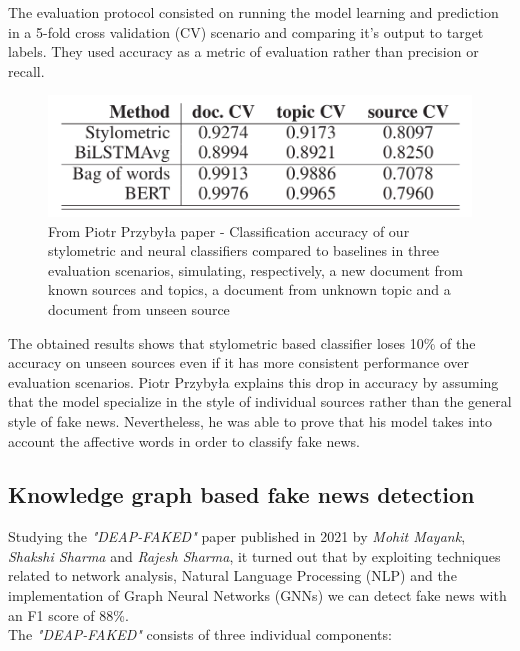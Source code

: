 \documentclass[10pt, english]{report}
\begin{document}
The evaluation protocol consisted on running the model learning and prediction in a 5-fold cross validation (CV) scenario and comparing it's output to target labels. They used accuracy as a metric of evaluation rather than precision or recall.

\begin{figure}[H]
	\centering
	\includegraphics[scale=0.3]{img/styled_model_result.png}
	\caption{From Piotr Przybyła paper - Classiﬁcation accuracy of our stylometric and neural classiﬁers compared to baselines in three evaluation scenarios, simulating, respectively, a new document from known sources and topics, a document from unknown topic and a document from unseen source}
\end{figure}

The obtained results shows that stylometric based classifier loses 10\% of the accuracy on unseen sources even if it has more consistent performance over evaluation scenarios. Piotr Przybyła explains this drop in accuracy by assuming that the model specialize in the style of individual sources rather than the general style of fake news. Nevertheless, he was able to prove that his model takes into account the affective words in order to classify fake news.
\subsection{Knowledge graph based fake news detection \cite{mayank2021deap}}
Studying the \textit{"DEAP-FAKED"} paper published in 2021 by \textit{Mohit Mayank}, \textit{Shakshi Sharma} and \textit{Rajesh Sharma}, it turned out that by exploiting techniques related to network analysis, Natural Language Processing (NLP) and the implementation of Graph Neural Networks (GNNs) we can detect fake news with an F1 score of 88\%.\\

The \textit{"DEAP-FAKED"} consists of three individual components:
\end{document}
